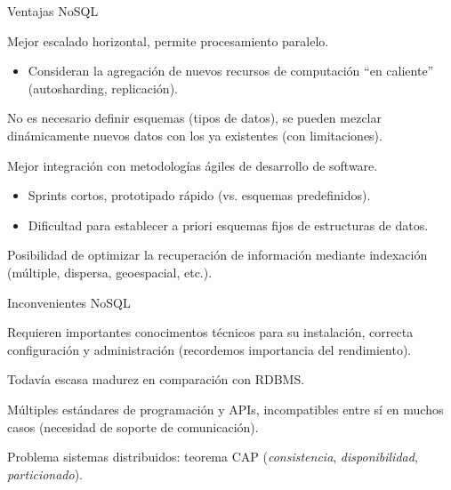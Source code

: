 
\begin{frame}{Ventajas NoSQL}
 \begin{wideitemize}
  \item Mejor escalado horizontal, permite procesamiento paralelo.
  \begin{itemize}
   \item Consideran la agregación de nuevos recursos de computación ``en caliente''
   (autosharding, replicación).
  \end{itemize}

  \item No es necesario definir esquemas (tipos de datos), se pueden mezclar dinámicamente
  nuevos datos con los ya existentes (con limitaciones).
  
  \item Mejor integración con metodologías ágiles de desarrollo de software.
  \begin{itemize}
   \item Sprints cortos, prototipado rápido (vs. esquemas predefinidos).
   \item Dificultad para establecer a priori esquemas fijos de estructuras de datos.
  \end{itemize}

  \item Posibilidad de optimizar la recuperación de información mediante indexación
  (múltiple, dispersa, geoespacial, etc.).
  
 \end{wideitemize}

\end{frame}


\begin{frame}{Inconvenientes NoSQL}
 \begin{wideitemize}
  \item Requieren importantes conocimentos técnicos para su instalación, correcta
  configuración y administración (recordemos importancia del rendimiento).
  \item Todavía escasa madurez en comparación con RDBMS.
  \item Múltiples estándares de programación y APIs, incompatibles entre sí en
  muchos casos (necesidad de soporte de comunicación).
  \item Problema sistemas distribuidos: teorema CAP (\textit{consistencia}, \textit{disponibilidad},
  \textit{particionado}).
  
 \end{wideitemize}

\end{frame}

